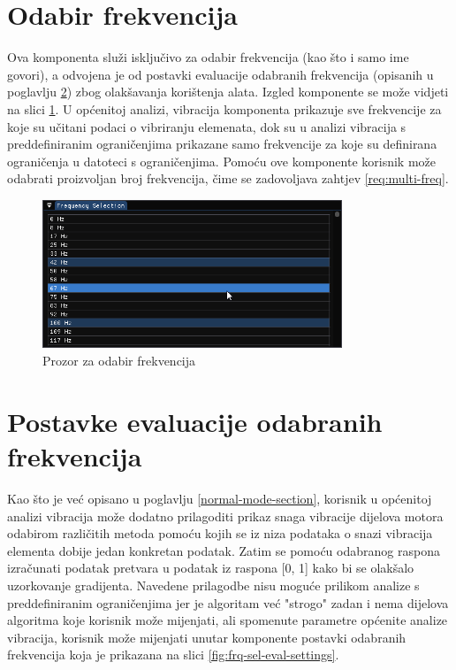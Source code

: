 \documentclass[times, utf8, diplomski]{fer}
\begin{document}
\section{Odabir frekvencija} \label{frequency-selection-section}

Ova komponenta služi isključivo za odabir frekvencija (kao što i samo ime govori), a odvojena je od postavki evaluacije odabranih frekvencija (opisanih u poglavlju \ref{frequency-settings-section}) zbog olakšavanja korištenja alata. Izgled komponente se može vidjeti na slici \ref{fig:frequency-selection-view}. U općenitoj analizi, vibracija komponenta prikazuje sve frekvencije za koje su učitani podaci o vibriranju elemenata, dok su u analizi vibracija s preddefiniranim ograničenjima prikazane samo frekvencije za koje su definirana ograničenja u datoteci s ograničenjima. Pomoću ove komponente korisnik može odabrati proizvoljan broj frekvencija, čime se zadovoljava zahtjev \ref{req:multi-freq}.

\begin{figure} [H]
	\centering
    \includegraphics[width=0.8\textwidth]{frequency_selection_view.png}
    \caption{Prozor za odabir frekvencija}
    \label{fig:frequency-selection-view}
\end{figure}

\section{Postavke evaluacije odabranih frekvencija} \label{frequency-settings-section}

Kao što je već opisano u poglavlju \ref{normal-mode-section}, korisnik u općenitoj analizi vibracija može dodatno prilagoditi prikaz snaga vibracije dijelova motora odabirom različitih metoda pomoću kojih se iz niza podataka o snazi vibracija elementa dobije jedan konkretan podatak. Zatim se pomoću odabranog raspona izračunati podatak pretvara u podatak iz raspona [0, 1] kako bi se olakšalo uzorkovanje gradijenta. Navedene prilagodbe nisu moguće prilikom analize s preddefiniranim ograničenjima jer je algoritam već "strogo" zadan i nema dijelova algoritma koje korisnik može mijenjati, ali spomenute parametre općenite analize vibracija, korisnik može mijenjati unutar komponente postavki odabranih frekvencija koja je prikazana na slici \ref{fig:frq-sel-eval-settings}.
\end{document}
